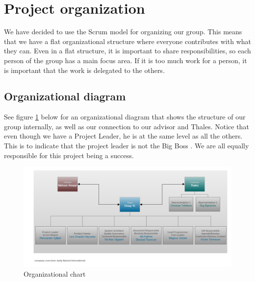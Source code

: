 

\section{Project organization}
We have decided to use the Scrum model for organizing our group. This means that we have a flat organizational structure where everyone contributes with what they can. Even in a flat structure, it is important to share responsibilities, so each person of the group has a main focus area. If it is too much work for a person, it is important that the work is delegated to the others.

\subsection{Organizational diagram}
See figure \ref{fig:organizationalchart} below for an organizational diagram that shows the structure of our group internally, as well as our connection to our advisor and Thales. Notice that even though we have a Project Leader, he is at the same level as all the others. This is to indicate that the project leader is not the Big Boss . We are all equally responsible for this project being a success.
\begin{figure}[hbt]
\begin{center}
\includegraphics[width=\textwidth]{Organizational_Chart_v2}
\caption{Organizational chart} \label{fig:organizationalchart}
\end{center}
\end{figure}

\newpage

